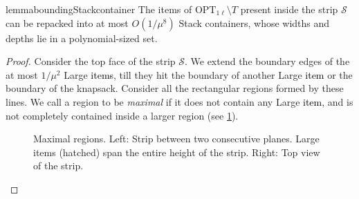 \documentclass[10pt,a4paper]{amsart}
\newcommand{\kvnnew}[1]{\textcolor{black}{#1}}
\newcommand{\kvn}[1]{#1}
\newcommand{\kvnrnew}[1]{\todo[color=yellow,size=\tiny]{KVN: #1}}
\newcommand{\SM}{\mathcal{S}}
\theoremstyle{definition}
\newcommand{\OPTonel}{\text{OPT}_{1\ell}}
\begin{document}
\begin{restatable}{lemma}{boundingStackcontainer}
\label{lem:boundingStackcontainer}
    The items of $\OPTonel \setminus T$ present inside the strip $\SM$ can be repacked into at most $O(1/\mu^8)$ Stack containers, whose widths and depths lie in a polynomial-sized set.
\end{restatable}
\begin{proof}
Consider the top face of the strip $\SM$. We extend the boundary edges of the at most $1/\mu^2$ Large \kvnnew{items}, till they hit the boundary of another Large \kvnnew{item} or the boundary of the knapsack. Consider all the rectangular regions formed by these lines. We call a region to be \textit{maximal} if it does not contain any Large \kvnnew{item}, and is not completely contained inside a larger region (see \cref{fig:maximal-regions}).
    \begin{figure}
        \centering
                
                
                
        
        \caption{\kvn{Maximal regions. Left: Strip between two consecutive planes. Large items (hatched) span the entire height of the strip. Right: Top view of the strip.}}
        \label{fig:maximal-regions}
    \end{figure}
    

\end{proof}
\end{document}
